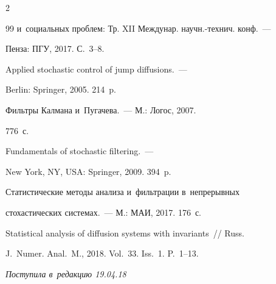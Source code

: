 \begin{multicols}{2}
{{\begin{thebibliography}{99}
и~социальных проблем: Тр. XII Междунар. научн.-технич. конф.~--- 

Пенза: ПГУ, 2017. С.~3--8.




 Applied stochastic control of jump diffusions.~--- 

Berlin: Springer, 2005. 214~p.




 Фильтры Калмана и~Пугачева.~--- М.: Логос, 2007. 

776~с.




 Fundamentals of stochastic filtering.~--- 

New York, NY, USA: Springer, 2009. 394~p.




 Статистические методы анализа и~фильтрации в~непрерывных 

стохастических системах.~--- М.: МАИ, 2017. 176~с.





Statistical analysis of diffusion systems with invariants~// Russ. 

J.~Numer. Anal.~M., 2018. Vol.~33. Iss.~1. P.~1--13.



 \end{thebibliography}



 }

 }



\end{multicols}



\vspace*{-3pt}



\hfill{\small\textit{Поступила в~редакцию 19.04.18}}



\vspace*{8pt}



